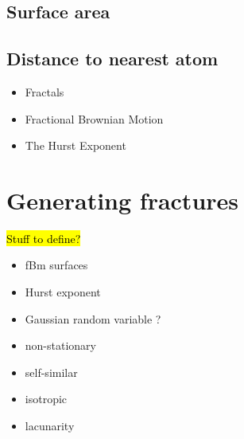 % 
% 
% 
% 
% 




\section{Surface area}
\section{Distance to nearest atom}
\begin{itemize}
    \item Fractals
    \item Fractional Brownian Motion
    \item The Hurst Exponent
\end{itemize}

\chapter{Generating fractures}
\hl{Stuff to define?}
\begin{itemize}
    \item fBm surfaces
    \item Hurst exponent
    \item Gaussian random variable ?
    \item non-stationary
    \item self-similar
    \item isotropic
    \item lacunarity
\end{itemize}

